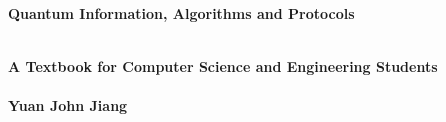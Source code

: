 %

\thispagestyle{empty}

\vspace{3cm}
  \begin{center}
	\bfseries \Huge \latex Quantum Information, Algorithms and Protocols \par   %
        ~\\
	\bfseries \LARGE A Textbook for Computer Science and Engineering Students \\   %
        ~\\
        \bfseries \Large Yuan John Jiang \par   %

        \vspace{3cm}
    
    \end{center}
    
\par

\newpage
